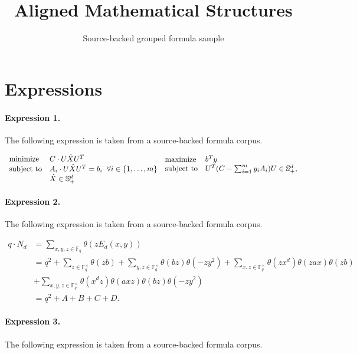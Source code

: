 \documentclass[11pt]{article}
\title{Aligned Mathematical Structures}
\author{Source-backed grouped formula sample}
\date{}
\begin{document}
\maketitle
\section{Expressions}
\paragraph{Expression 1.} The following expression is taken from a source-backed formula corpus.

\begin{align*} \begin{array}{lll}\text{\rm minimize} & C \cdot U \hat{X}U^T \\ \text{\rm subject to} & A_i \cdot U \hat{X}U^T = b_i \;\; \forall i \in \{1,\ldots,m\} \\& \hat{X} \in \mathbb{S}^d_{+}\end{array} \begin{array}{lll}\text{\rm maximize} & b^Ty \\ \text{\rm subject to} & U^T (C - \sum^{m}_{i=1} y_i A_i) U \in \mathbb{S}^d_{+}, \\ \\\end{array} \end{align*}

\paragraph{Expression 2.} The following expression is taken from a source-backed formula corpus.

\begin{align*}q\cdot N_d&=\sum_{x,y,z\in\mathbb{F}_q}\theta(zE_d(x,y))\\&=q^2+\sum_{z\in\mathbb{F}_{q}^{\times}}\theta(zb)+\sum_{y,z\in\mathbb{F}_{q}^{\times}}\theta(bz)\theta(-zy^2)+\sum_{x,z\in\mathbb{F}_{q}^{\times}}\theta(zx^d)\theta(zax)\theta(zb)\\&+\sum_{x,y,z\in\mathbb{F}_{q}^{\times}}\theta(x^dz)\theta(axz)\theta(bz)\theta(-zy^2)\\&=q^2+A+B+C+D.\end{align*}

\paragraph{Expression 3.} The following expression is taken from a source-backed formula corpus.
\end{document}
